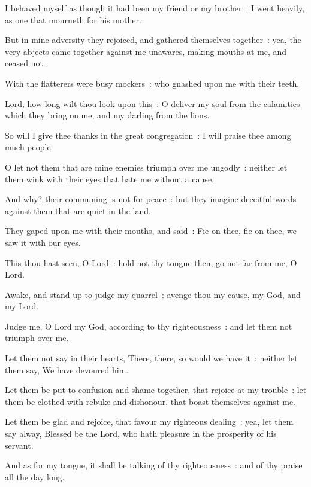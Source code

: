 I behaved myself as though it had been my friend or my brother~: I went heavily, as one that mourneth for his mother.\par
{}But in mine adversity they rejoiced, and gathered themselves together~: yea, the very abjects came together against me unawares, making mouths at me, and ceased not.\par
{}With the flatterers were busy mockers~: who gnashed upon me with their teeth.\par
{}Lord, how long wilt thou look upon this~: O deliver my soul from the calamities which they bring on me, and my darling from the lions.\par
{}So will I give thee thanks in the great congregation~: I will praise thee among much people.\par
{}O let not them that are mine enemies triumph over me ungodly~: neither let them wink with their eyes that hate me without a cause.\par
{}And why? their communing is not for peace~: but they imagine deceitful words against them that are quiet in the land.\par
{}They gaped upon me with their mouths, and said~: Fie on thee, fie on thee, we saw it with our eyes.\par
{}This thou hast seen, O Lord~: hold not thy tongue then, go not far from me, O Lord.\par
{}Awake, and stand up to judge my quarrel~: avenge thou my cause, my God, and my Lord.\par
{}Judge me, O Lord my God, according to thy righteousness~: and let them not triumph over me.\par
{}Let them not say in their hearts, There, there, so would we have it~: neither let them say, We have devoured him.\par
{}Let them be put to confusion and shame together, that rejoice at my trouble~: let them be clothed with rebuke and dishonour, that boast themselves against me.\par
{}Let them be glad and rejoice, that favour my righteous dealing~: yea, let them say alway, Blessed be the Lord, who hath pleasure in the prosperity of his servant.\par
{}And as for my tongue, it shall be talking of thy righteousness~: and of thy praise all the day long.\par

